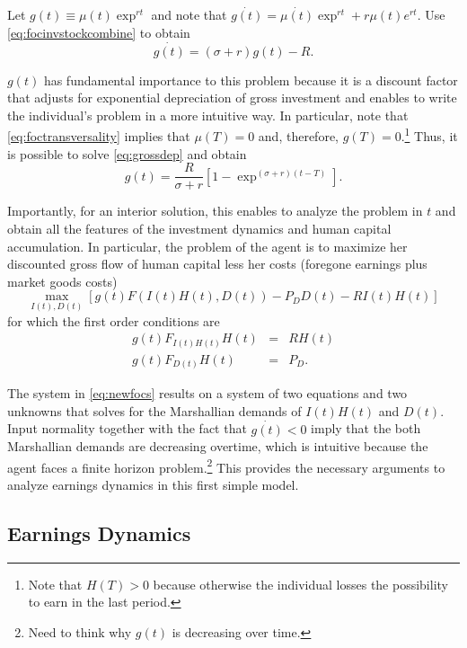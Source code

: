 \noindent Let $g(t) \equiv \mu(t) \exp^{rt}$ and note that $\dot{g(t)} = \dot{\mu(t)} \exp^{rt} + r \mu(t) e ^{rt}$. Use \eqref{eq:focinvstockcombine} to obtain 
\begin{equation}
\dot{g(t)} = (\sigma + r ) g(t) - R \label{eq:grossdep}.
\end{equation}

\indent $g(t)$ has fundamental importance to this problem because it is a discount factor that adjusts for exponential depreciation of gross investment and enables to write the individual's problem in a more intuitive way. In particular, note that \eqref{eq:foctransversality} implies that $\mu(T) = 0 $ and, therefore, $g(T) = 0$.\footnote{Note that $H(T) > 0$ because otherwise the individual losses the possibility to earn in the last period.} Thus, it is possible to solve \eqref{eq:grossdep} and obtain
\begin{equation}
g(t) = \frac{R}{\sigma + r} \left[ 1 - \exp^{(\sigma + r)(t - T)} \right].
\end{equation}

\indent Importantly, for an interior solution, this enables to analyze the problem in $t$ and obtain all the features of the investment dynamics and human capital accumulation. In particular, the problem of the agent is to maximize her discounted gross flow of human capital less her costs (foregone earnings plus market goods costs) 
\begin{equation}
\max_{I(t), D(t)} \left[ g(t) F(I(t) H(t), D(t)) - P_{D} D(t) - R I (t) H(t) \right]
\end{equation}
for which the first order conditions are
\begin{eqnarray}
g(t) F_{I(t)H(t)} H(t) &=& R H (t) \nonumber \\
g(t) F_{D(t)} H(t) &=& P_{D} \label{eq:newfocs}. 
\end{eqnarray}

The system in \eqref{eq:newfocs} results on a system of two equations and two unknowns that solves for the Marshallian demands of $I(t)H(t)$ and $D(t)$. Input normality together with the fact that $\dot{g(t)} < 0$ imply that the both Marshallian demands are decreasing overtime, which is intuitive because the agent faces a finite horizon problem.\footnote{Need to think why $g(t)$ is decreasing over time.} This provides the necessary arguments to analyze earnings dynamics in this first simple model.
\subsection{Earnings Dynamics}
